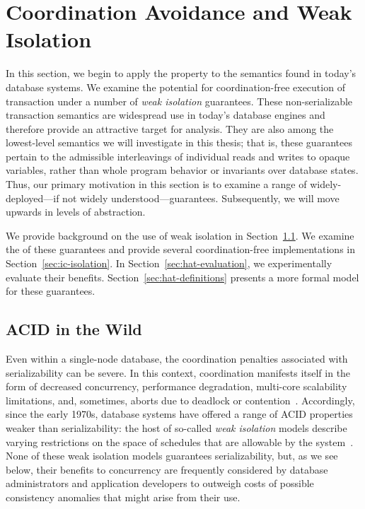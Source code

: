 
\chapter{Coordination Avoidance and Weak Isolation}
\label{c.isolation}

In this section, we begin to apply the \iconfluence property to the
semantics found in today's database systems. We examine the
potential for coordination-free execution of transaction under a
number of \textit{weak isolation} guarantees. These non-serializable
transaction semantics are widespread use in today's database engines
and therefore provide an attractive target for \iconfluence
analysis. They are also among the lowest-level semantics we will
investigate in this thesis; that is, these guarantees pertain to the
admissible interleavings of individual reads and writes to opaque
variables, rather than whole program behavior or invariants over
database states. Thus, our primary motivation in this section is to
examine a range of widely-deployed---if not widely
understood---guarantees. Subsequently, we will move upwards in levels
of abstraction.

We provide background on the use of weak isolation in
Section~\ref{sec:modernacid}. We examine the \iconfluence of these
guarantees and provide several coordination-free implementations in
Section~\ref{sec:ic-isolation}. In Section~\ref{sec:hat-evaluation},
we experimentally evaluate their
benefits. Section~\ref{sec:hat-definitions} presents a more formal
model for these guarantees.

\section{ACID in the Wild}
\label{sec:modernacid}

Even within a single-node database, the coordination penalties
associated with serializability can be severe. In this context,
coordination manifests itself in the form of decreased concurrency,
performance degradation, multi-core scalability limitations, and,
sometimes, aborts due to deadlock or
contention~\cite{gray-isolation}. Accordingly, since the early 1970s,
database systems have offered a range of ACID properties weaker than
serializability: the host of so-called \textit{weak isolation} models
describe varying restrictions on the space of schedules that are
allowable by the system~\cite{adya, ansi-sql, ansicritique}. None of
these weak isolation models guarantees serializability, but, as we see
below, their benefits to concurrency are frequently considered by
database administrators and application developers to outweigh costs
of possible consistency anomalies that might arise from their use.

